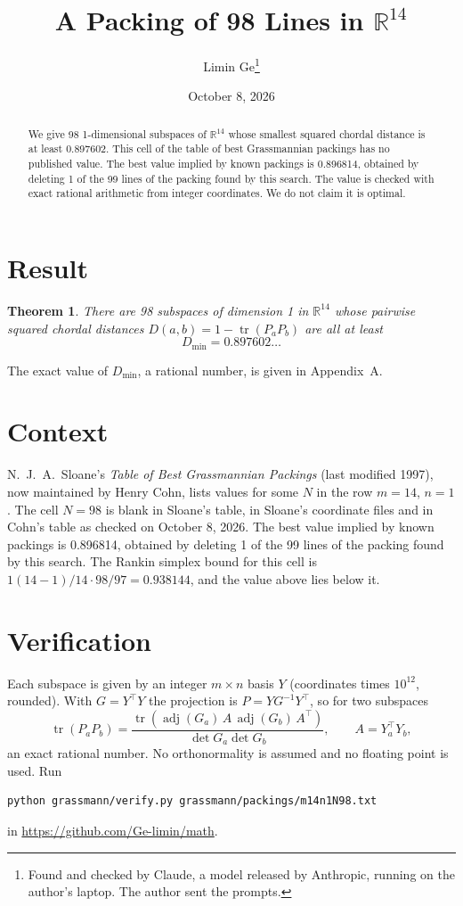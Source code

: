 \documentclass[11pt,a4paper]{article}
\title{A Packing of 98 Lines in $\mathbb{R}^{14}$}
\author{Limin Ge\thanks{Found and checked by Claude, a model released by Anthropic, running on the author's laptop. The author sent the prompts.}}
\date{October 8, 2026}
\newtheorem*{theorem}{Theorem}
\begin{document}
\maketitle
\begin{abstract}
We give 98 1-dimensional subspaces of $\mathbb{R}^{14}$ whose smallest squared chordal distance is at least 0.897602. This cell of the table of best Grassmannian packings has no published value. The best value implied by known packings is 0.896814, obtained by deleting 1 of the 99 lines of the packing found by this search. The value is checked with exact rational arithmetic from integer coordinates. We do not claim it is optimal.
\end{abstract}

\section{Result}
\begin{theorem}
There are 98 subspaces of dimension 1 in $\mathbb{R}^{14}$ whose pairwise squared chordal distances $D(a,b) = 1 - \operatorname{tr}(P_aP_b)$ are all at least
\[ D_{\min} = 0.897602\ldots \]
\end{theorem}
The exact value of $D_{\min}$, a rational number, is given in Appendix~A.


\section{Context}
N.~J.~A.~Sloane's \emph{Table of Best Grassmannian Packings} (last modified 1997), now maintained by Henry Cohn, lists values for some $N$ in the row $m=14$, $n=1$. The cell $N=98$ is blank in Sloane's table, in Sloane's coordinate files and in Cohn's table as checked on October 8, 2026. The best value implied by known packings is 0.896814, obtained by deleting 1 of the 99 lines of the packing found by this search. The Rankin simplex bound for this cell is $1(14-1)/14\cdot 98/97 = 0.938144$, and the value above lies below it.


\section{Verification}
Each subspace is given by an integer $m\times n$ basis $Y$ (coordinates times $10^{12}$, rounded). With $G=Y^\top Y$ the projection is $P=YG^{-1}Y^\top$, so for two subspaces
\[ \operatorname{tr}(P_aP_b)=\frac{\operatorname{tr}(\operatorname{adj}(G_a)\,A\,\operatorname{adj}(G_b)\,A^\top)}{\det G_a\det G_b},\qquad A=Y_a^\top Y_b, \]
an exact rational number. No orthonormality is assumed and no floating point is used. Run
\begin{verbatim}
python grassmann/verify.py grassmann/packings/m14n1N98.txt
\end{verbatim}
in \url{https://github.com/Ge-limin/math}.
\end{document}
